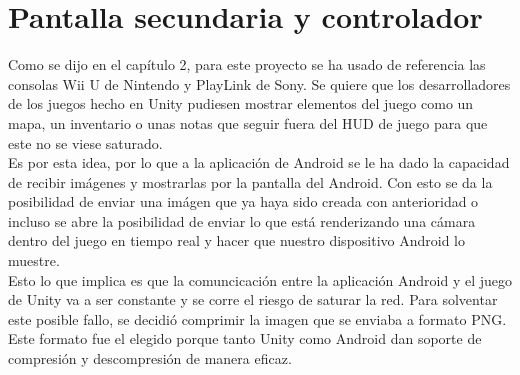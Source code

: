 \section{Pantalla secundaria y controlador}
\label{cap4:pantallasecundaria}

Como se dijo en el cap\'itulo 2, para este proyecto se ha usado de referencia las consolas Wii U de Nintendo y PlayLink de Sony. Se quiere que los desarrolladores de los juegos hecho en Unity pudiesen mostrar elementos del juego como un mapa, un inventario o unas notas que seguir fuera del HUD de juego para que este no se viese saturado.
\\
Es por esta idea, por lo que a la aplicaci\'on de Android se le ha dado la capacidad de recibir im\'agenes y mostrarlas por la pantalla del Android. Con esto se da la posibilidad de enviar una im\'agen que ya haya sido creada con anterioridad o incluso se abre la posibilidad de enviar lo que est\'a renderizando una c\'amara dentro del juego en tiempo real y hacer que nuestro dispositivo Android lo muestre. 
\\
Esto lo que implica es que la comuncicaci\'on entre la aplicaci\'on Android y el juego de Unity va a ser constante y se corre el riesgo de saturar la red. Para solventar este posible fallo, se decidi\'o comprimir la imagen que se enviaba a formato PNG. Este formato fue el elegido porque tanto Unity como Android dan soporte de compresi\'on y descompresi\'on de manera eficaz. 



